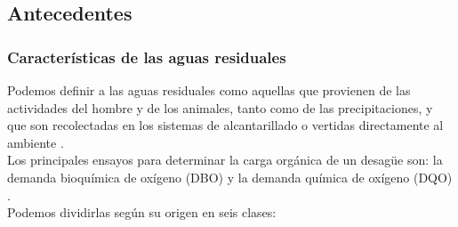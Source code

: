 \subsection*{Antecedentes}
\subsubsection*{Características de las aguas residuales}
Podemos definir a las aguas residuales como aquellas que provienen de las actividades del hombre y de los animales, tanto como de las precipitaciones, y que son recolectadas en los sistemas de alcantarillado o vertidas directamente al ambiente \citep{carreno17}.\\
Los principales ensayos para determinar la carga orgánica de un desagüe son: la demanda bioquímica de oxígeno (DBO) y la demanda química de oxígeno (DQO) \citep{carreno17}.\\
Podemos dividirlas según su origen en seis clases:
